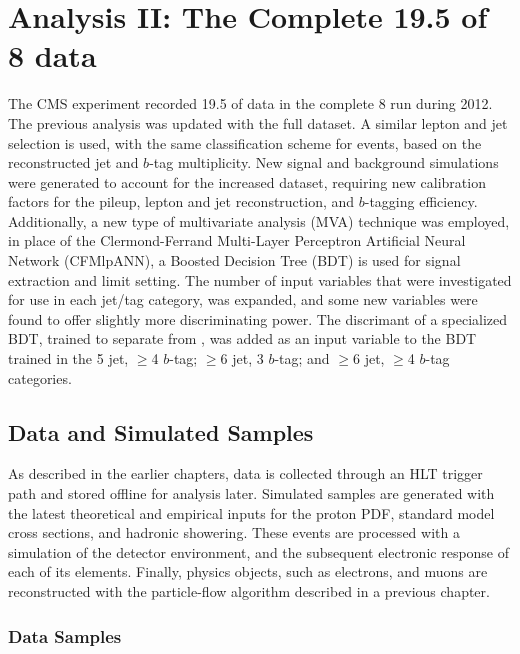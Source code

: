 \chapter{Analysis II: The Complete 19.5 \fbinv of 8 \TeV data}
\label{analysis_II_overview}

\par The CMS experiment recorded 19.5 \fbinv of data in the complete 8
\TeV run during 2012.  The previous analysis was updated with the full
dataset.  A similar lepton and jet selection is used, with the same
classification scheme for events, based on the reconstructed jet and
$b$-tag multiplicity.  New signal and background simulations were
generated to account for the increased dataset, requiring new
calibration factors for the pileup, lepton and jet reconstruction, and
$b$-tagging efficiency.  Additionally, a new type of multivariate
analysis (MVA) technique was employed, in place of the Clermond-Ferrand
Multi-Layer Perceptron Artificial Neural Network (CFMlpANN), a Boosted
Decision Tree (BDT) is used for signal extraction and limit setting.
The number of input variables that were investigated for use in each
jet/tag category, was expanded, and some new variables were found to
offer slightly more discriminating power.  The discrimant of a
specialized BDT, trained to separate \ttbb from \ttH, was added as an
input variable to the BDT trained in the 5 jet, $\ge$4 $b$-tag; $\ge$6
jet, 3 $b$-tag; and $\ge$6 jet, $\ge$4 $b$-tag categories.  

\section{Data and Simulated Samples}
\label{data_and_mc_II_overview}

\par As described in the earlier chapters, data is collected through
an HLT trigger path and stored offline for analysis later.  Simulated
samples are generated with the latest theoretical and empirical inputs
for the proton PDF, standard model cross sections, and hadronic
showering.  These events are processed with a simulation of the
detector environment, and the subsequent electronic response of each
of its elements.  Finally, physics objects, such as electrons, and
muons are reconstructed with the particle-flow algorithm described in
a previous chapter.  


\subsection{Data Samples}
\label{data_II_overview}

